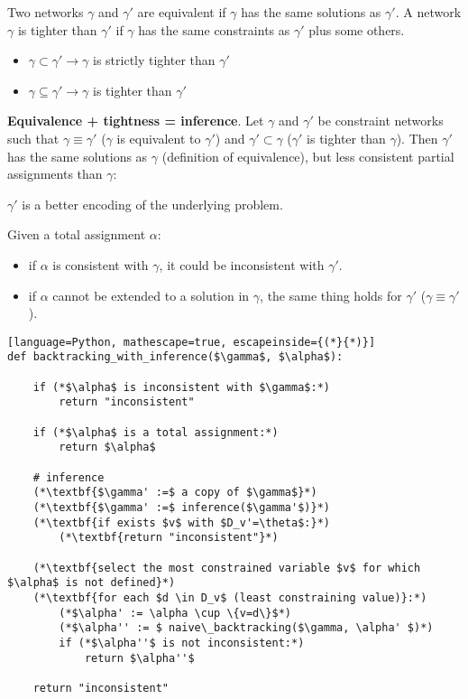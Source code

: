 \documentclass{article}
\begin{document}
Two networks $\gamma$ and $\gamma'$ are equivalent if $\gamma$ has the same solutions as $\gamma'$. A network $\gamma$ is tighter than $\gamma'$ if $\gamma$ has the same constraints as $\gamma'$ plus some others.

\begin{itemize}
    \item $\gamma \subset \gamma' \rightarrow \gamma$ is strictly tighter than $\gamma'$
    \item $\gamma \subseteq \gamma' \rightarrow \gamma$ is tighter than $\gamma'$
\end{itemize}

\textbf{Equivalence + tightness = inference}. Let $\gamma$ and $\gamma'$ be constraint networks such that $\gamma \equiv \gamma'$ ($\gamma$ is equivalent to $\gamma'$) and $\gamma' \subset \gamma$ ($\gamma'$ is tighter than $\gamma$). Then $\gamma'$ has the same solutions as $\gamma$ (definition of equivalence), but less consistent partial assignments than $\gamma$:
\begin{center}
    $\gamma'$ is a better encoding of the underlying problem.
\end{center}

Given a total assignment $\alpha$:
\begin{itemize}
    \item if $\alpha$ is consistent with $\gamma$, it could be inconsistent with $\gamma'$.
    \item if $\alpha$ cannot be extended to a solution in $\gamma$, the same thing holds for $\gamma'$ ($\gamma \equiv \gamma'$).
\end{itemize}

\newpage

\begin{lstlisting}[language=Python, mathescape=true, escapeinside={(*}{*)}]
def backtracking_with_inference($\gamma$, $\alpha$):

    if (*$\alpha$ is inconsistent with $\gamma$:*)
        return "inconsistent"

    if (*$\alpha$ is a total assignment:*)
        return $\alpha$

    # inference
    (*\textbf{$\gamma' :=$ a copy of $\gamma$}*)
    (*\textbf{$\gamma' :=$ inference($\gamma'$)}*)
    (*\textbf{if exists $v$ with $D_v'=\theta$:}*)
        (*\textbf{return "inconsistent"}*)

    (*\textbf{select the most constrained variable $v$ for which $\alpha$ is not defined}*)
    (*\textbf{for each $d \in D_v$ (least constraining value)}:*)
        (*$\alpha' := \alpha \cup \{v=d\}$*)
        (*$\alpha'' := $ naive\_backtracking($\gamma, \alpha' $)*)
        if (*$\alpha''$ is not inconsistent:*)
            return $\alpha''$

    return "inconsistent"
    
\end{lstlisting}
\end{document}
